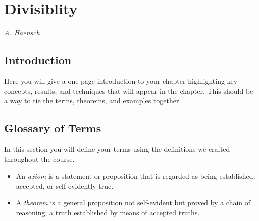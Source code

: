 \documentclass[12pt]{article}
\begin{document}





\section{Divisiblity} %

\setcounter{equation}{0}
\setcounter{theorem}{0}

\begin{center}
{\it A. Haensch} %
\end{center}

\subsection{Introduction}

Here you will give a one-page introduction to your chapter highlighting key concepts, results, and techniques that will appear in the chapter.  This should be a way to tie the terms, theorems, and examples together. 

\subsection{Glossary of Terms}

In this section you will define your terms using the definitions we crafted throughout the course.

\begin{itemize}
\item An {\em axiom} is a statement or proposition that is regarded as being established, accepted, or self-evidently true.

\item A {\em theorem} is a general proposition not self-evident but proved by a chain of reasoning; a truth established by means of accepted truths.
\end{itemize}
\end{document}
